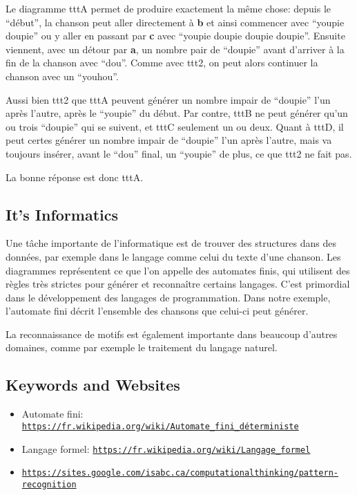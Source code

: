 \documentclass[a4paper,11pt]{report}
\newcommand{\BrochureUrlText}[1]{\texttt{#1}}
\newcommand{\taskGraphicsFolder}{..}
\begin{document}
Le diagramme tttA permet de produire exactement la même chose: depuis le “début”, la chanson peut aller directement à \textbf{b} et ainsi commencer avec “youpie doupie” ou y aller en passant par \textbf{c} avec “youpie doupie doupie doupie”. Ensuite viennent, avec un détour par \textbf{a}, un nombre pair de “doupie” avant d’arriver à la fin de la chanson avec “dou”. Comme avec ttt2, on peut alors continuer la chanson avec un “youhou”.

{\centering%
\par}

Aussi bien ttt2 que tttA peuvent générer un nombre impair de “doupie” l’un après l’autre, après le “youpie” du début. Par contre, tttB ne peut générer qu’un ou trois “doupie” qui se suivent, et tttC seulement un ou deux. Quant à tttD, il peut certes générer un nombre impair de “doupie” l’un après l’autre, mais va toujours insérer, avant le “dou” final, un “youpie” de plus, ce que ttt2 ne fait pas.

La bonne réponse est donc tttA.


\subsection*{It’s Informatics}

Une tâche importante de l’informatique est de trouver des structures dans des données, par exemple dans le langage comme celui du texte d’une chanson. Les diagrammes représentent ce que l’on appelle des automates finis, qui utilisent des règles très strictes pour générer et reconnaître certains langages. C’est primordial dans le développement des langages de programmation. Dans notre exemple, l’automate fini décrit l’ensemble des chansons que celui-ci peut générer.

La reconnaissance de motifs est également importante dans beaucoup d’autres domaines, comme par exemple le traitement du langage naturel.

{\raggedright

\subsection*{Keywords and Websites}

\begin{itemize}
  \item Automate fini: \href{https://fr.wikipedia.org/wiki/Automate_fini_d\%C3\%A9terministe}{\BrochureUrlText{https://fr.wikipedia.org/wiki/Automate\_fini\_déterministe}}
  \item Langage formel: \href{https://fr.wikipedia.org/wiki/Langage_formel}{\BrochureUrlText{https://fr.wikipedia.org/wiki/Langage\_formel}}
  \item \href{https://sites.google.com/isabc.ca/computationalthinking/pattern-recognition}{\BrochureUrlText{https://sites.google.com/isabc.ca/computationalthinking/pattern-recognition}}
\end{itemize}


}
\end{document}
